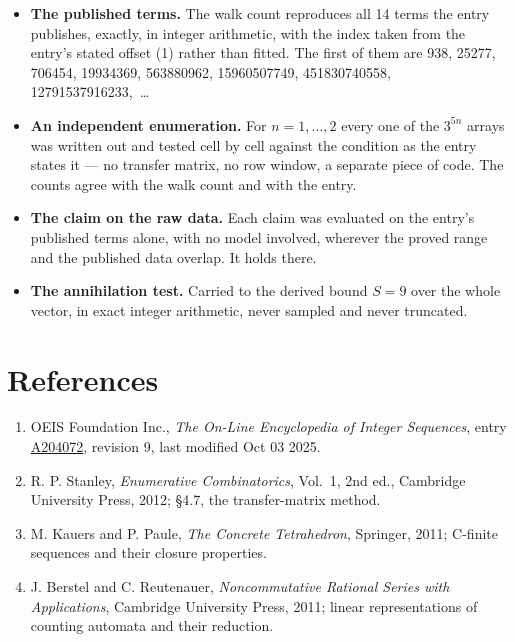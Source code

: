 \documentclass[11pt]{article}
\theoremstyle{definition}
\begin{document}
\begin{itemize}

\item {\bfseries The published terms.} The walk count reproduces all 14 terms the entry publishes, exactly, in integer arithmetic, with the index taken from the entry's stated offset (1) rather than fitted. The first of them are 938, 25277, 706454, 19934369, 563880962, 15960507749, 451830740558, 12791537916233,~\dots

\item {\bfseries An independent enumeration.} For $n = 1,\dots,2$ every one of the $3^{5n}$ arrays was written out and tested cell by cell against the condition as the entry states it --- no transfer matrix, no row window, a separate piece of code. The counts agree with the walk count and with the entry.

\item {\bfseries The claim on the raw data.} Each claim was evaluated on the entry's published terms alone, with no model involved, wherever the proved range and the published data overlap. It holds there.

\item {\bfseries The annihilation test.} Carried to the derived bound $S = 9$ over the whole vector, in exact integer arithmetic, never sampled and never truncated.

\end{itemize}

\section{References}

\begin{enumerate}

\item OEIS Foundation Inc., \emph{The On-Line Encyclopedia of Integer Sequences}, entry \href{https://oeis.org/A204072}{A204072}, revision 9, last modified Oct 03 2025.

\item R. P. Stanley, \emph{Enumerative Combinatorics}, Vol.~1, 2nd ed., Cambridge University Press, 2012; \S4.7, the transfer-matrix method.

\item M. Kauers and P. Paule, \emph{The Concrete Tetrahedron}, Springer, 2011; C-finite sequences and their closure properties.

\item J. Berstel and C. Reutenauer, \emph{Noncommutative Rational Series with Applications}, Cambridge University Press, 2011; linear representations of counting automata and their reduction.

\end{enumerate}
\end{document}
